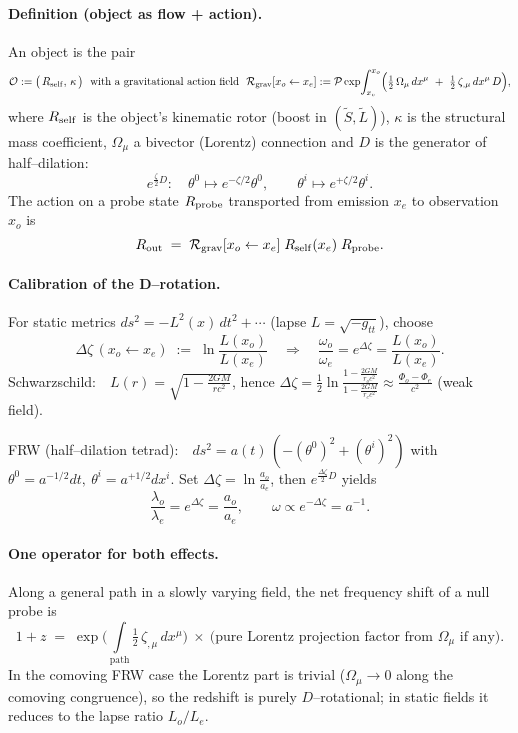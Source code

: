 \paragraph{Definition (object as flow + action).}
An object is the pair
\[
\mathcal O := \big(\,R_{\rm self},\,\kappa\,\big)\ \ \text{with a gravitational action field}\ \
\mathcal R_{\rm grav}[x_o\leftarrow x_e] := \mathcal P\exp\!\int_{x_e}^{x_o}\!\Big(\tfrac{1}{2}\,\Omega_\mu\,dx^\mu\ +\ \tfrac{1}{2}\,\zeta_{,\mu}\,dx^\mu\,D\Big),
\]
where $R_{\rm self}$ is the object's kinematic rotor (boost in $(\tilde S,\tilde L)$), 
$\kappa$ is the structural mass coefficient, $\Omega_\mu$ a bivector (Lorentz) connection 
and $D$ is the generator of half–dilation:
\[
e^{\frac{\zeta}{2}D}:\quad \theta^0\mapsto e^{-\zeta/2}\theta^0,\qquad \theta^i\mapsto e^{+\zeta/2}\theta^i.
\]
The action on a probe state $R_{\rm probe}$ transported from emission $x_e$ to observation $x_o$ is
\[
R_{\rm out} \;=\; \mathcal R_{\rm grav}[x_o\leftarrow x_e]\; R_{\rm self}(x_e)\; R_{\rm probe}.
\]

\paragraph{Calibration of the D–rotation.}
For static metrics $ds^2=-L^2(x)\,dt^2 + \cdots$ (lapse $L=\sqrt{-g_{tt}}$), choose
\[
\Delta\zeta\,(x_o\!\leftarrow\! x_e) \;:=\; \ln\frac{L(x_o)}{L(x_e)} \quad\Rightarrow\quad
\frac{\omega_o}{\omega_e}=e^{\Delta\zeta}=\frac{L(x_o)}{L(x_e)}.
\]
Schwarzschild:\ \ $L(r)=\sqrt{1-\frac{2GM}{rc^2}}$, hence 
$\displaystyle \Delta\zeta=\tfrac{1}{2}\ln\frac{1-\frac{2GM}{r_o c^2}}{1-\frac{2GM}{r_e c^2}}
\approx \frac{\Phi_o-\Phi_e}{c^2}$ (weak field).

FRW (half–dilation tetrad):\ \ $ds^2=a(t)\,(-(\theta^0)^2+(\theta^i)^2)$ with 
$\theta^0=a^{-1/2}dt,\ \theta^i=a^{+1/2}dx^i$.
Set $\Delta\zeta=\ln\frac{a_o}{a_e}$, then $e^{\frac{\Delta\zeta}{2}D}$ yields
\[
\frac{\lambda_o}{\lambda_e}=e^{\Delta\zeta}=\frac{a_o}{a_e},\qquad \omega\propto e^{-\Delta\zeta}=a^{-1}.
\]

\paragraph{One operator for both effects.}
Along a general path in a slowly varying field, the net frequency shift of a null probe is
\[
1+z \;=\; \exp\!\Big(\int\limits_{\text{path}}\tfrac{1}{2}\,\zeta_{,\mu}\,dx^\mu\Big)\ \times\ \text{(pure Lorentz projection factor from }\Omega_\mu\text{ if any)}.
\]
In the comoving FRW case the Lorentz part is trivial ($\Omega_\mu\to0$ along the comoving congruence), 
so the redshift is purely $D$–rotational; in static fields it reduces to the lapse ratio $L_o/L_e$.
